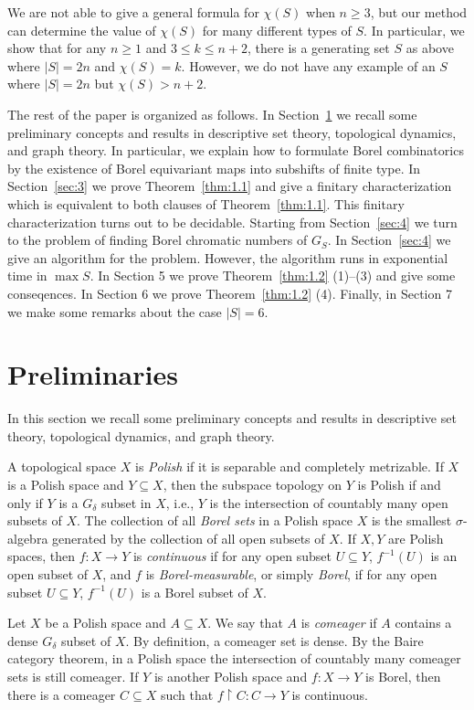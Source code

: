 \documentclass[11pt]{amsart}
\theoremstyle{definition}
\begin{document}
We are not able to give a general formula for $\chi(S)$ when $n\geq 3$, but our method can determine the value of $\chi(S)$ for many different types of $S$. In particular, we show that for any $n\geq 1$ and $3\leq k\leq n+2$, there is a generating set $S$ as above where $|S|=2n$ and $\chi(S)=k$. However, we do not have any example of an $S$ where $|S|=2n$ but $\chi(S)>n+2$.

The rest of the paper is organized as follows. In Section~\ref{sec:2} we recall some preliminary concepts and results in descriptive set theory, topological dynamics, and graph theory. In particular, we explain how to formulate Borel combinatorics by the existence of Borel equivariant maps into subshifts of finite type. In Section~\ref{sec:3} we prove Theorem~\ref{thm:1.1} and give a finitary characterization which is equivalent to both clauses of Theorem~\ref{thm:1.1}. This finitary characterization turns out to be decidable. Starting from Section~\ref{sec:4} we turn to the problem of finding Borel chromatic numbers of $G_S$. In Section~\ref{sec:4} we give an algorithm for the problem. However, the algorithm runs in exponential time in $\max S$. In Section 5 we prove Theorem~\ref{thm:1.2} (1)--(3) and give some conseqences. In Section 6 we prove Theorem~\ref{thm:1.2} (4). Finally, in Section 7 we make some remarks about the case $|S|=6$.

\section{Preliminaries}\label{sec:2}

In this section we recall some preliminary concepts and results in descriptive set theory, topological dynamics, and graph theory. 

A topological space $X$ is {\em Polish} if it is separable and completely metrizable. If $X$ is a Polish space and $Y\subseteq X$, then the subspace topology on $Y$ is Polish if and only if $Y$ is a $G_\delta$ subset in $X$, i.e., $Y$ is the intersection of countably many open subsets of $X$. The collection of all {\em Borel sets} in a Polish space $X$ is the smallest $\sigma$-algebra generated by the collection of all open subsets of $X$. If $X, Y$ are Polish spaces, then $f\colon X\to Y$ is {\em continuous} if for any open subset $U\subseteq Y$, $f^{-1}(U)$ is an open subset of $X$, and $f$ is {\em Borel-measurable}, or simply {\em Borel}, if for any open subset $U\subseteq Y$, $f^{-1}(U)$ is a Borel subset of $X$.

Let $X$ be a Polish space and $A\subseteq X$. We say that $A$ is {\em comeager} if $A$ contains a dense $G_\delta$ subset of $X$. By definition, a comeager set is dense. By the Baire category theorem, in a Polish space the intersection of countably many comeager sets is still comeager. If $Y$ is another Polish space and $f\colon X\to Y$ is Borel, then there is a comeager $C\subseteq X$ such that $f\upharpoonright C\colon C\to Y$ is continuous.
\end{document}
